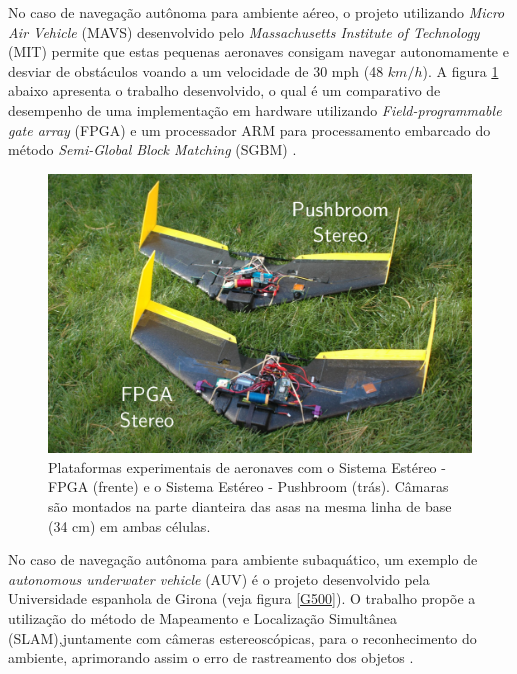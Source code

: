 No caso de navegação autônoma para ambiente aéreo, o projeto utilizando \textit{Micro Air Vehicle} (MAVS) desenvolvido pelo \textit{Massachusetts Institute of Technology} (MIT) permite que estas pequenas aeronaves consigam navegar autonomamente e desviar de obstáculos voando a um velocidade de 30 mph (48 $km/h$). A figura \ref{mit_drones} abaixo apresenta o trabalho desenvolvido, o qual é um comparativo de desempenho de uma implementação em hardware utilizando \textit{Field-programmable gate array} (FPGA) e um processador ARM para processamento embarcado do método \textit{Semi-Global Block Matching} (SGBM) \cite{BarryMIT}.

\begin{figure}[H]
 	\centering
 	\includegraphics[scale=0.30]{./Resources/mit_drones.png}
 	\caption{Plataformas experimentais de aeronaves com o Sistema Estéreo - FPGA (frente) e o Sistema Estéreo - Pushbroom (trás). Câmaras são montados na parte dianteira das asas na mesma linha de base (34 cm) em ambas células.}
 	\label{mit_drones}
\end{figure}

No caso de navegação autônoma para ambiente subaquático, um exemplo de \textit{autonomous underwater vehicle} (AUV) é o projeto desenvolvido pela Universidade espanhola de Girona (veja figura \ref{G500}). O trabalho propõe a utilização do método de Mapeamento e Localização Simultânea (SLAM),juntamente com câmeras estereoscópicas, para o reconhecimento do ambiente, aprimorando assim o erro de rastreamento dos objetos \cite{Nagappa2013}.

